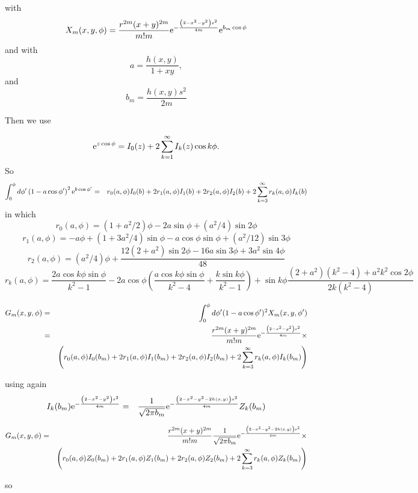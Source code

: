 \documentclass[11pt,openany]{report}
\newcommand{\e}{{\rm e}}
\begin{document}
{{with
$$X_{m}(x,y,\phi)=\frac{r^{2m}(x+y)^{2m}}{m!m}\e^{-\frac{\left(2-x^{2}-y^{2}\right)s^{2}}{4m}}\e^{b_{m}\cos\phi}$$
and
with
$$a=\frac{h(x,y)}{1+xy},$$
and
$$b_{m}=\frac{h(x,y)s^{2}}{2m}$$



Then we use

$$\e^{z\cos\phi}=I_{0}(z)+2\sum_{k=1}^{\infty}I_{k}(z)\cos k\phi.$$
So
\begin{eqnarray}
\int_{0}^{\phi}d\phi'\left(1-a\cos\phi' \right)^{2}\e^{b\cos\phi'}&=&
r_{0}(a,\phi)I_{0}(b)+2r_{1}(a,\phi)I_{1}(b)+2r_{2}(a,\phi)I_{2}(b)+2\sum_{k=3}^{\infty}r_{k}(a,\phi)I_{k}(b)
\end{eqnarray}
in which
$$r_{0}(a,\phi)=(1+a^{2}/2)\phi-2a\sin\phi+(a^{2}/4)\sin2\phi$$
$$r_{1}(a,\phi)=-a\phi+(1+3a^{2}/4)\sin\phi-a\cos\phi\sin\phi+(a^{2}/12)\sin3\phi$$
$$r_{2}(a,\phi)=(a^{2}/4)\phi+\frac{12(2+a^{2})\sin2\phi-16a\sin3\phi+3a^{2}\sin4\phi}{48}$$
$$r_{k}(a,\phi)=\frac{2a\cos k\phi\sin\phi}{k^{2}-1}-2a\cos\phi\left(\frac{a\cos k\phi\sin\phi}{k^{2}-4}+\frac{k\sin k\phi}{k^{2}-1}\right)+\sin k\phi\frac{(2+a^{2})(k^{2}-4)+a^{2}k^{2}\cos2\phi}{2k(k^{2}-4)}$$




\begin{eqnarray}
G_{m}(x,y,\phi)&=&\int_{0}^{\phi}d\phi'(1-a\cos\phi')^{2}X_{m}(x,y,\phi')\\&=&\frac{r^{2m}(x+y)^{2m}}{m!m}\e^{-\frac{\left(2-x^{2}-y^{2}\right)s^{2}}{4m}}\times\\&&\left(r_{0}(a,\phi)I_{0}(b_{m})+2r_{1}(a,\phi)I_{1}(b_{m})+2r_{2}(a,\phi)I_{2}(b_{m})+2\sum_{k=3}^{\infty}r_{k}(a,\phi)I_{k}(b_{m})\right)\end{eqnarray}

using again
\begin{eqnarray}
I_{k}(b_{m})\e^{-\frac{\left(2-x^{2}-y^{2}\right)s^{2}}{4m}}&=&\frac{1}{\sqrt{2\pi b_{m}}}\e^{-\frac{\left(2-x^{2}-y^{2}-2h(x,y)\right)s^{2}}{4m}}Z_{k}(b_{m})
\end{eqnarray}

\begin{eqnarray}
G_{m}(x,y,\phi)&=&\frac{r^{2m}(x+y)^{2m}}{m!m}\frac{1}{\sqrt{2\pi b_{m}}}\e^{-\frac{\left(2-x^{2}-y^{2}-2h(x,y)\right)s^{2}}{4m}}\times\\&&\left(r_{0}(a,\phi)Z_{0}(b_{m})+2r_{1}(a,\phi)Z_{1}(b_{m})+2r_{2}(a,\phi)Z_{2}(b_{m})+2\sum_{k=3}^{\infty}r_{k}(a,\phi)Z_{k}(b_{m})\right)\end{eqnarray}

so

}}
\end{document}
